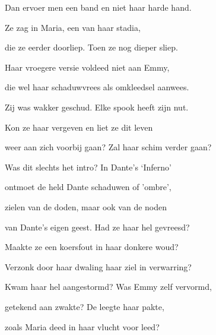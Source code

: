 Dan ervoer men een band
en niet haar harde hand.

Ze zag in Maria,
een van haar stadia,

die ze eerder doorliep.
Toen ze nog dieper sliep.

Haar vroegere versie
voldeed niet aan Emmy,

die wel haar schaduwvrees
als omkleedsel aanwees.

Zij was wakker geschud.
Elke spook heeft zijn nut.

Kon ze haar vergeven
en liet ze dit leven

weer aan zich voorbij gaan?
Zal haar schim verder gaan?

Was dit slechts het intro?
In Dante’s ‘Inferno’

ontmoet de held Dante
schaduwen of 'ombre',

zielen van de doden,
maar ook van de noden

van Dante’s eigen geest.
Had ze haar hel gevreesd?

Maakte ze een koersfout
in haar donkere woud?

Verzonk door haar dwaling
haar ziel in verwarring?

Kwam haar hel aangestormd?
Was Emmy zelf vervormd,

getekend aan zwakte?
De leegte haar pakte,

zoals Maria deed
in haar vlucht voor leed?
